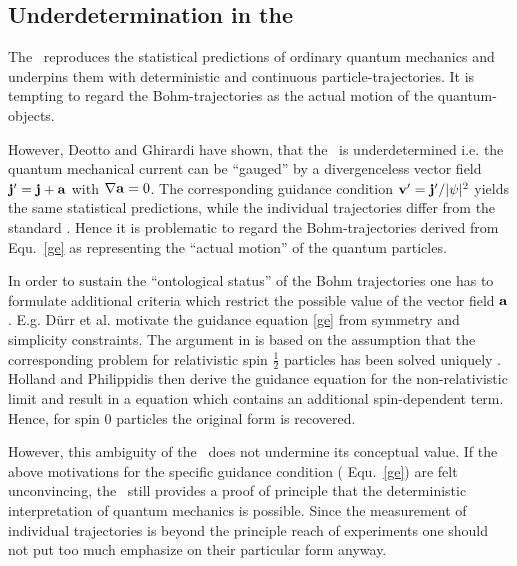 \subsection{Underdetermination in the \dbb}

The \dbb\ reproduces the statistical predictions of ordinary quantum mechanics and underpins them with deterministic and continuous 
particle-trajectories. It is tempting to regard the Bohm-trajectories as the actual motion of the quantum-objects.

However, Deotto and Ghirardi \cite{deotto} have shown, that the \dbb\ is underdetermined i.e. the quantum mechanical current can be 
``gauged'' by a divergenceless vector field ${\bf j}^{\prime}={\bf j}+{\bf a}$ with $\nabla {\bf a}=0$. 
The corresponding  guidance condition ${\bf v^{\prime}}={\bf j}^{\prime}/|\psi|^2$  yields the same statistical predictions, while
the individual trajectories differ from the standard \dbb. Hence it is problematic to regard the Bohm-trajectories derived from 
Equ.~\ref{ge} as  representing the ``actual motion'' of the quantum particles.

In order to sustain the ``ontological status'' of the Bohm trajectories one has to formulate additional criteria which 
restrict the possible value of the vector field ${\bf a}$. E.g. D\"urr et al. \cite{dgz}  motivate the guidance equation \ref{ge} from 
symmetry and simplicity constraints. The argument in \cite{hollandundphi} is based on the assumption that the corresponding problem 
for relativistic 
spin $\frac{1}{2}$ particles has been solved uniquely \cite{holland99}. Holland and Philippidis then derive the guidance equation for 
the non-relativistic limit and result in a equation which contains an additional spin-dependent term. Hence, for spin 0 particles the 
original form is recovered. 

However, this ambiguity of the \dbb\ does not undermine its conceptual value. If the above motivations for the specific guidance 
condition ( Equ.~\ref{ge}) are felt unconvincing, the \dbb\ still provides a proof of principle that the deterministic interpretation 
of quantum mechanics is possible. Since the measurement of individual trajectories is beyond the principle reach of experiments 
one should not put too much emphasize on their particular form anyway. 


